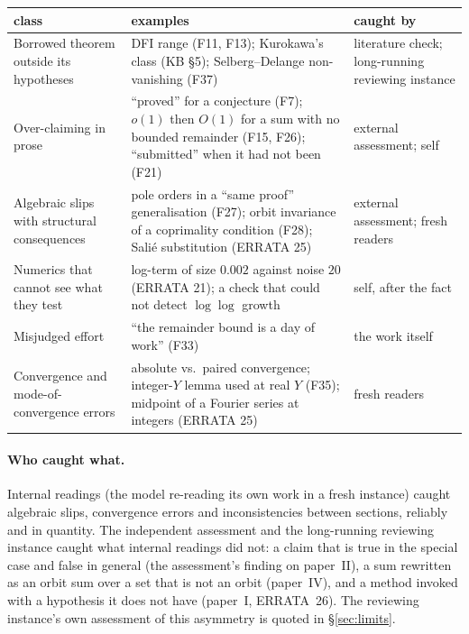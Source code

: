 \documentclass[11pt,a4paper]{article}
\begin{document}
\begin{center}\small
\begin{tabular}{@{}p{3.6cm}p{6.6cm}p{3.6cm}@{}}
\toprule
class & examples & caught by\\
\midrule
Borrowed theorem outside its hypotheses & DFI range (F11, F13); Kurokawa's class (KB \S5); Selberg--Delange
non-vanishing (F37) & literature check; long-running reviewing instance\\
Over-claiming in prose & ``proved'' for a conjecture (F7); $o(1)$ then $O(1)$ for a sum with no bounded remainder
(F15, F26); ``submitted'' when it had not been (F21) & external assessment; self\\
Algebraic slips with structural consequences & pole orders in a ``same proof'' generalisation (F27); orbit
invariance of a coprimality condition (F28); Sali\'e substitution (ERRATA 25) & external assessment; fresh readers\\
Numerics that cannot see what they test & log-term of size $0.002$ against noise $20$ (ERRATA 21); a check that
could not detect $\log\log$ growth & self, after the fact\\
Misjudged effort & ``the remainder bound is a day of work'' (F33) & the work itself\\
Convergence and mode-of-convergence errors & absolute vs.\ paired convergence; integer-$Y$ lemma used at real $Y$
(F35); midpoint of a Fourier series at integers (ERRATA 25) & fresh readers\\
\bottomrule
\end{tabular}
\end{center}

\paragraph{Who caught what.} Internal readings (the model re-reading its own work in a fresh instance) caught
algebraic slips, convergence errors and inconsistencies between sections, reliably and in quantity. The independent
assessment and the long-running reviewing instance caught what internal readings did not: a claim that is true in the special case and false in general (the
assessment's finding on paper~II), a sum rewritten as an orbit sum over a set that is not an orbit (paper~IV), and a
method invoked with a hypothesis it does not have (paper~I, ERRATA~26). The reviewing instance's own assessment of
this asymmetry is quoted in \S\ref{sec:limits}.
\end{document}
